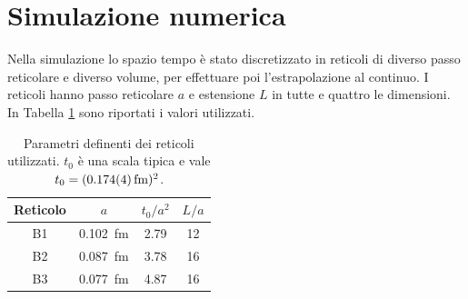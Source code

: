 \documentclass{article}
\numberwithin{equation}{subsection}
\begin{document}
\newpage
\section{Simulazione numerica}
Nella simulazione lo spazio tempo è stato discretizzato in reticoli di diverso passo reticolare e diverso volume, per effettuare poi l'estrapolazione al continuo. I reticoli hanno passo reticolare $a$ e estensione $L$ in tutte e quattro le dimensioni. In Tabella \ref{reticoli} sono riportati i valori utilizzati. 
\begin{table}[h]
    \centering
    \begin{tabular}{||c c c c||} 
     \hline
     Reticolo & $a$& $t_0/a^2$ & $L/a$\\[0.5ex] 
     \hline\hline
     B1     & 0.102 \,\textup{fm} & 2.79 & 12 \\
     B2  & 0.087 \,\textup{fm} & 3.78 & 16 \\
     B3 & 0.077 \,\textup{fm} & 4.87 & 16 \\[1ex] 
     \hline
    \end{tabular}
    \caption{Parametri definenti dei reticoli utilizzati. $t_0$ è una scala tipica e vale $t_0=(0.174(4)\,\textup{fm})^2$.}
    \label{reticoli}
\end{table}
\end{document}
